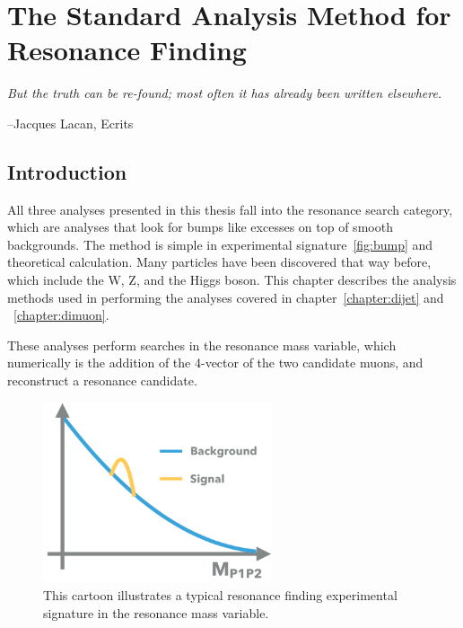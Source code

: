\chapter{The Standard Analysis Method for Resonance Finding}
\label{StandardAnalysisMethod}

\epigraph{\textit{But the truth can be re-found; most often it has already been written elsewhere.}}{--Jacques Lacan, Ecrits}

\section{Introduction}
All three analyses presented in this thesis fall into the resonance search category, which are analyses that look for bumps like excesses on top of smooth backgrounds. The method is simple in experimental signature~\ref{fig:bump} and theoretical calculation. Many particles have been discovered that way before, which include the W\cite{Arnison:142059}, Z, and the Higgs boson. This chapter describes the analysis methods used in performing the analyses covered in chapter~\ref{chapter:dijet} and ~\ref{chapter:dimuon}. 

These analyses perform searches in the resonance mass variable, which numerically is the addition of the 4-vector of the two candidate muons, and reconstruct a resonance candidate. 

\begin{figure}[!htb]
    \begin{center}
        \includegraphics[width=0.6\textwidth]{figures/chapter_analysismethod/resonance}
        \caption{
            This cartoon illustrates a typical resonance finding experimental signature in the resonance mass variable. 
        }
        \label{fig:triggerturnon}
    \end{center}
\end{figure}

